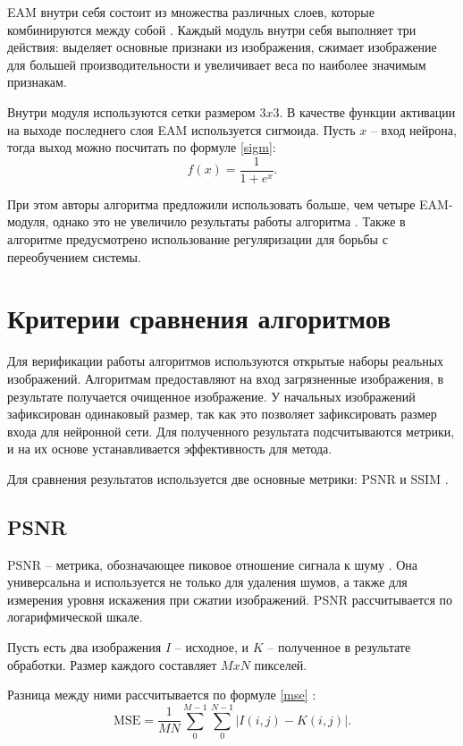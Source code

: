 EAM внутри себя состоит из множества различных слоев, которые комбинируются между собой \cite{ridnet}.
Каждый модуль внутри себя выполняет три действия: выделяет основные признаки из изображения, сжимает изображение для большей производительности и увеличивает веса по наиболее значимым признакам.

Внутри модуля используются сетки размером $3x3$. 
В качестве функции активации на выходе последнего слоя EAM используется сигмоида. 
Пусть $x$ -- вход нейрона, тогда выход можно посчитать по формуле \eqref{sigm}:
\begin{equation}
	\label{sigm}
	f(x) = \frac{1}{1+e^x}.
\end{equation}

При этом авторы алгоритма предложили использовать больше, чем четыре EAM-модуля, однако это не увеличило результаты работы алгоритма \cite{ridnet2}.
Также в алгоритме предусмотрено использование регуляризации для борьбы с переобучением системы.

\newpage
\section{Критерии сравнения алгоритмов}
Для верификации работы алгоритмов используются открытые наборы реальных изображений. 
Алгоритмам предоставляют на вход загрязненные изображения, в результате получается очищенное изображение.
У начальных изображений зафиксирован одинаковый размер, так как это позволяет зафиксировать размер входа для нейронной сети.
Для полученного результата подсчитываются метрики, и на их основе устанавливается эффективность для метода.

Для сравнения результатов используется две основные метрики: PSNR и SSIM \cite{vs}.

\subsection{PSNR}
PSNR -- метрика, обозначающее пиковое отношение сигнала к шуму \cite{rs}.
Она универсальна и используется не только для удаления шумов, а также для измерения уровня искажения при сжатии изображений.
PSNR рассчитывается по логарифмической шкале.

Пусть есть два изображения $I$ -- исходное, и $K$ -- полученное в результате обработки.
Размер каждого составляет $MxN$ пикселей.

Разница между ними рассчитывается по формуле \eqref{mse} \cite{rs}:
\begin{equation}
	\label{mse}
	\mathrm{MSE} = \frac{1}{MN}\sum_{0}^{M-1}\sum_{0}^{N-1}|I(i, j) - K(i, j)|.
\end{equation}


